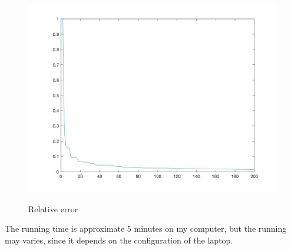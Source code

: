 \documentclass[letter,10pt]{article}
\begin{document}
\begin{figure}[H]
\centering
\begin{minipage}{0.495\linewidth}
\includegraphics[width=1\linewidth]{error.jpg}\\
\end{minipage}\hfill
\caption{Relative error}
\end{figure}

The running time is approximate 5 minutes on my computer, but the running may varies, since it depends on the configuration of the laptop.
\end{document}
